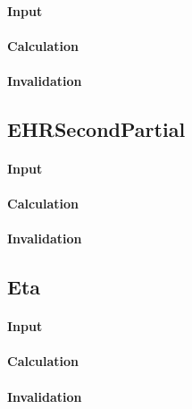 \paragraph{Input}

\paragraph{Calculation}

\paragraph{Invalidation}

\bigskip

\subsection{EHRSecondPartial}

\paragraph{Input}

\paragraph{Calculation}

\paragraph{Invalidation}

\bigskip

\subsection{Eta}

\paragraph{Input}

\paragraph{Calculation}

\paragraph{Invalidation}

\bigskip

